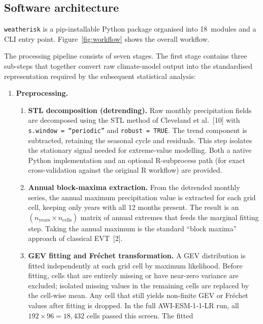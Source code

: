 \documentclass[preprint,12pt,a4paper]{elsarticle}
\newcommand{\rev}[1]{{#1}}
\begin{document}
\subsection{Software architecture}
\label{sec:architecture}

\texttt{weatherisk} is a pip-installable Python package organised
into 18~modules and a CLI entry point.  Figure~\ref{fig:workflow}
shows the overall workflow.

\rev{The processing pipeline consists of seven stages. The first
stage contains three sub-steps that together convert raw climate-model
output into the standardised representation required by the
subsequent statistical analysis:}

\begin{enumerate}
\item \textbf{\rev{Preprocessing.}}
  \begin{enumerate}
  \item[\textbf{(a)}] \textbf{\rev{STL decomposition (detrending).}}
    \rev{Raw monthly precipitation fields are decomposed using the
    STL method of Cleveland et al.~[10] with \texttt{s.window =
    ``periodic''} and \texttt{robust = TRUE}.  The trend component is
    subtracted, retaining the seasonal cycle and residuals. This step
    isolates the stationary signal needed for extreme-value
    modelling. Both a native Python implementation and an optional
    R-subprocess path (for exact cross-validation against the
    original R workflow) are provided.}
  \item[\textbf{(b)}] \textbf{\rev{Annual block-maxima extraction.}}
    \rev{From the detrended monthly series, the annual maximum
    precipitation value is extracted for each grid cell, keeping
    only years with all 12 months present. The result is an
    $(n_{\text{years}} \times n_{\text{cells}})$ matrix of annual
    extremes that feeds the marginal fitting step. Taking the
    annual maximum is the standard ``block maxima'' approach of
    classical EVT~[2].}
  \item[\textbf{(c)}] \textbf{\rev{GEV fitting and Fr\'{e}chet
    transformation.}}
    \rev{A GEV distribution is fitted independently at each grid cell
    by maximum likelihood. Before fitting, cells that are entirely
    missing or have near-zero variance are excluded; isolated missing
    values in the remaining cells are replaced by the cell-wise mean.
    Any cell that still yields non-finite GEV or Fr\'{e}chet values
    after fitting is dropped. In the full AWI-ESM-1-1-LR run, all
    $192 \times 96 = 18{,}432$ cells passed this screen. The fitted
}
\end{enumerate}
\end{enumerate}
\end{document}
